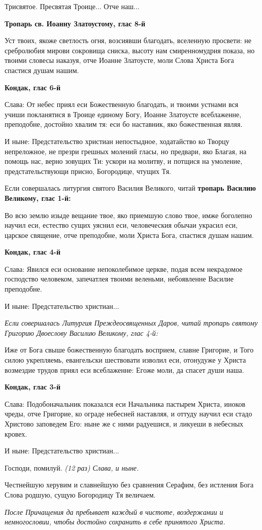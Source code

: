 Трисвятое. Пресвятая Троице... Отче наш...




\medskip
\bfseries Тропарь св. Иоанну Златоустому, глас 8-й\normalfont{}


Уст твоих, якоже светлость огня, возсиявши благодать, вселенную просвети: не сребролюбия мирови сокровища сниска, высоту нам смиренномудрия показа, но твоими словесы наказуя, отче Иоанне Златоусте, моли Слова Христа Бога спастися душам нашим.


\medskip
\bfseries Кондак, глас 6-й\normalfont{}


Слава: От небес приял еси Божественную благодать, и твоими устнами вся учиши покланятися в Троице единому Богу, Иоанне Златоусте всеблаженне, преподобне, достойно хвалим тя: еси бо наставник, яко божественная являя.


И ныне: Предстательство христиан непостыдное, ходатайство ко Творцу непреложное, не презри грешных молений гласы, но предвари, яко Благая, на помощь нас, верно зовущих Ти: ускори на молитву, и потщися на умоление, предстательствующи присно, Богородице, чтущих Тя.


\itshape 


Если совершалась литургия святого Василия Великого, читай\normalfont{} \bfseries тропарь Василию Великому, глас 1-й:\normalfont{}


Во всю землю изыде вещание твое, яко приемшую слово твое, имже боголепно научил еси, естество сущих уяснил еси, человеческия обычаи украсил еси, царское священие, отче преподобне, моли Христа Бога, спастися душам нашим.


\medskip
\bfseries Кондак, глас 4-й\normalfont{}


Слава: Явился еси основание непоколебимое церкве, подая всем некрадомое господство человеком, запечатлея твоими веленьми, небоявленне Василие преподобне.

И ныне: Предстательство христиан...


\itshape Если совершалась Литургия Преждеосвященных Даров, читай тропарь святому Григорию Двоеслову Василию  Великому, глас 4-й:\normalfont{}

Иже от Бога свыше божественную благодать восприем, славне Григорие, и Того силою укрепляемь, евангельски шествовати изволил еси, отонудуже у Христа возмездие трудов приял еси всеблаженне: Егоже моли, да спасет души наша.  

\bfseries Кондак, глас 3-й\normalfont{}


Слава: Подобоначальник показался еси Начальника пастырем Христа, иноков чреды, отче Григорие, ко ограде небесней наставляя, и оттуду научил еси стадо Христово заповедем Его: ныне же с ними радуешися, и ликуеши в небесных кровех.


И ныне: Предстательство христиан...


Господи, помилуй. \itshape (12 раз)\normalfont{} Слава, и ныне.


Честнейшую херувим и славнейшую без сравнения Серафим, без истления Бога Слова родшую, сущую Богородицу Тя величаем.

\itshape После Причащения да пребывает каждый в чистоте, воздержании и немногословии, чтобы достойно сохранить в себе принятого Христа.\normalfont{}

\mychapterending